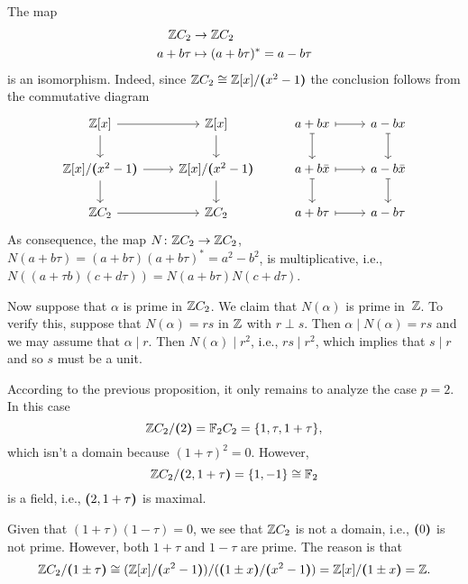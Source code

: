 \begin{rem}
    The map
    \begin{align*}
        \mathbb{Z} C_2 &\to\mathbb{Z} C_2\\
        a+b\tau &\mapsto (a+b\tau)^* = a-b\tau 
    \end{align*}
    is an isomorphism. Indeed, since $\mathbb{Z} C_2\cong\mathbb{Z}[x]/\textrm{\boldmath$($}x^2-1\textrm{\boldmath$)$}$ the conclusion follows from the commutative diagram
    $$
        \begin{tikzcd}
            {\Z[x]}
                    \arrow[r]
                    \arrow[d]
                &{\Z[x]}
                    \arrow[d]
                &a+bx
                    \arrow[r,mapsto]
                    \arrow[d,mapsto]
                &a-bx
                    \arrow[d,mapsto]\\
            {\Z[x]/\gen{x^2-1}}
                    \arrow[r]
                    \arrow[d]
                &{\Z[x]/\gen{x^2-1}}
                    \arrow[d]
                &a+b\bar x
                    \arrow[r,mapsto]
                    \arrow[d,mapsto]
                &a-b\bar x
                    \arrow[d,mapsto]\\
            \Z C_2
                    \arrow[r]
                &\Z C_2
                &a+b\tau
                    \arrow[r,mapsto]
                &a-b\tau
        \end{tikzcd}
    $$
    As consequence, the map $N\colon\mathbb{Z} C_2\to\mathbb{Z} C_2$, $N(a+b\tau)=(a+b\tau)(a+b\tau)^*=a^2-b^2$, is multiplicative, i.e., $N((a+\tau b)(c+d\tau))=N(a+b\tau)N(c+d\tau)$.

    Now suppose that $\alpha$ is prime in $\mathbb{Z} C_2$. We claim that $N(\alpha)$ is prime in~$\mathbb{Z}$. To verify this, suppose that $N(\alpha)=rs$ in $\mathbb{Z}$ with $r\perp s$. Then $\alpha\mid N(\alpha)=rs$ and we may assume that $\alpha\mid r$. Then $N(\alpha)\mid r^2$, i.e., $rs\mid r^2$, which implies that $s\mid r$ and so $s$ must be a unit.

    According to the previous proposition, it only remains to analyze the case $p=2$. In this case
    $$
        \mathbb{Z} C_2/\textrm{\boldmath$($}2\textrm{\boldmath$)$}=\mathbb F_2 C_2 = \{1,\tau, 1+\tau\},
    $$
    which isn't a domain because $(1+\tau)^2=0$. However,
    $$
        \mathbb{Z} C_2/\textrm{\boldmath$($}2,1+\tau\textrm{\boldmath$)$} = \{1,-1\} \cong \mathbb F_2
    $$
    is a field, i.e., $\textrm{\boldmath$($}2,1+\tau\textrm{\boldmath$)$}$ is maximal.

    Given that $(1+\tau)(1-\tau)=0$, we see that $\mathbb{Z} C_2$ is not a domain, i.e., $\textrm{\boldmath$($}0\textrm{\boldmath$)$}$ is not prime. However, both $1+\tau$ and $1-\tau$ are prime. The reason is that
    $$
        \mathbb{Z} C_2/\textrm{\boldmath$($}1\pm\tau\textrm{\boldmath$)$}\cong(\mathbb{Z}[x]/\textrm{\boldmath$($}x^2-1\textrm{\boldmath$)$})/(\textrm{\boldmath$($}1\pm x\textrm{\boldmath$)$}/\textrm{\boldmath$($}x^2-1\textrm{\boldmath$)$})
            = \mathbb{Z}[x]/\textrm{\boldmath$($}1\pm x\textrm{\boldmath$)$} = \mathbb{Z}.
    $$


\end{rem}
